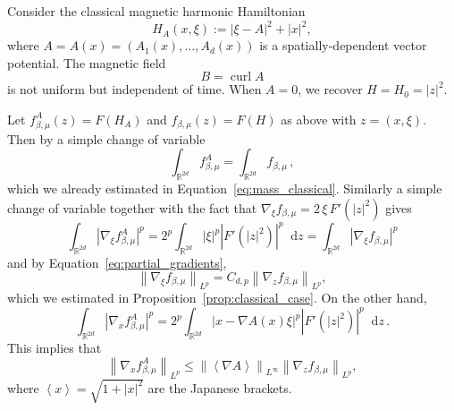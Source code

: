 \documentclass[11pt]{amsart}
\theoremstyle{plain}
\theoremstyle{definition}
\newcommand		{\RR}		{\mathbb R}			%
\newcommand		{\R}		{\RR}
\newcommand		{\Rdd}		{\R^{2d}}
\newcommand		\sfH		{\mathsf H}			%
\newcommand		{\lt}			{\left}				%
\newcommand		{\rt}			{\right}			%
\renewcommand	{\(}			{\lt(}
\renewcommand	{\)}			{\rt)}
\newcommand		{\bangle}[1]	{\lt\langle #1\rt\rangle}
\newcommand		{\weight}[1]	{\bangle{#1}}	%
\newcommand		{\n}[1]			{\lt\lvert #1 \rt\rvert}
\newcommand		{\nrm}[1]		{\lt\lVert #1\rt\rVert}
\newcommand		{\Nrm}[2]		{\nrm{#1}_{#2}}
\renewcommand		{\d}		{\mathop{}\!\mathrm{d}}		%
\newcommand			{\Dx}		{\nabla_x}
\newcommand			{\Dv}		{\nabla_\xi}
\DeclareMathOperator{\curl}		{curl}				%
\newcommand		{\intdd}		{\int_{\Rdd}}
\newcommand		{\vmag}		{v} 	%
\begin{document}
	Consider the classical magnetic harmonic Hamiltonian
	\begin{equation}\label{eq:Hamiltonian}
		H_A(x,\xi) := \n{\xi - A}^2+ \n{x}^2 ,
	\end{equation}
	where  $A=A(x) = (A_1(x), \ldots, A_d(x))$ is a spatially-dependent vector potential. The magnetic field 
	\begin{equation*}
		B = \curl A
	\end{equation*}
	is not uniform but independent of time. When $A=0$, we recover $H = H_0 = \n{z}^2$.
	
	

	Let $f_{\beta, \mu}^A(z) = F(H_A)$ and $f_{\beta, \mu}(z)=F(H)$ as above with $z = (x,\xi)$. Then by a simple change of variable
	\begin{equation}\label{eq:magnetic_classical_mass}
		\intdd f_{\beta, \mu}^A
		 = \intdd f_{\beta, \mu}\, ,
	\end{equation}
	which we already estimated in Equation~\eqref{eq:mass_classical}. Similarly a simple change of variable together with the fact that $\Dv f_{\beta,\mu} = 2\,\xi\, F'(\n{z}^2)$ gives
	\begin{equation*}
		\intdd \n{\nabla_\xi f_{\beta, \mu}^A}^p = 2^p \intdd \n{\xi}^p \n{F'(\n{z}^2)}^p \d z = \intdd \n{\nabla_\xi f_{\beta, \mu}}^p
	\end{equation*}
	and by Equation~\eqref{eq:partial_gradients},
    \begin{equation*}
        \Nrm{\Dv f_{\beta, \mu}}{L^p} = C_{d,p} \Nrm{\nabla_z f_{\beta, \mu}}{L^p} ,
    \end{equation*}
    which we estimated in Proposition~\ref{prop:classical_case}. On the other hand,
	\begin{equation*}
			\intdd \n{\nabla_x f_{\beta,\mu}^A}^p 
			= 2^p \intdd \n{x - \nabla A(x)\xi}^p \n{F'(\n{z}^2)}^p \d z \, .
	\end{equation*}
	This implies that
	\begin{equation}\label{eq:magnetic_Dxf_upper_bound}
		\Nrm{\Dx f_{\beta,\mu}^A}{L^p} \leq \Nrm{\weight{\nabla A}}{L^\infty} \Nrm{\nabla_z f_{\beta, \mu}}{L^p} ,
	\end{equation}
    where $\weight{x} = \sqrt{1+\n{x}^2}$ are the Japanese brackets.
\end{document}
